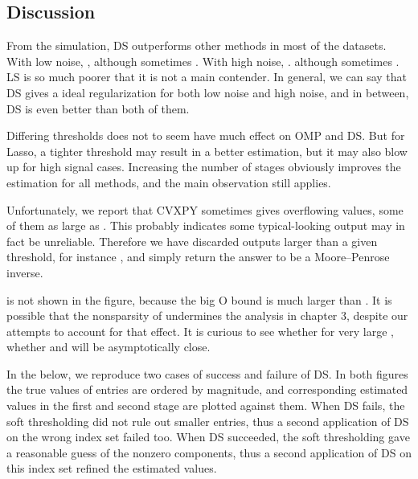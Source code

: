 
\subsection {Discussion}

From the simulation, DS outperforms other methods in most of the datasets.
With low noise, ,
although sometimes .
With high noise, .
although sometimes .
LS is so much poorer that it is not a main contender.
In general, we can say that DS gives a ideal regularization for both low noise and high noise, and in between, DS is even better than both of them.

Differing thresholds does not to seem have much effect on OMP and DS.
But for Lasso, a tighter threshold may result in a better estimation, but it may also blow up for high signal cases.
Increasing the number of stages obviously improves the estimation for all methods, and the main observation still applies.

Unfortunately, we report that CVXPY sometimes gives overflowing values, some of them as large as .
This probably indicates some typical-looking output may in fact be unreliable.
Therefore we have discarded outputs larger than a given threshold, for instance , and simply return the answer to be a Moore–Penrose inverse.

\m {\chi} is not shown in the figure, because the big O bound is much larger than \m {\tilde {\chi}}.
It is possible that the nonsparsity of  undermines the analysis in chapter 3, despite our attempts to account for that effect.
It is curious to see whether for very large , whether \m {\tilde {\chi}} and \m {\chi} will be asymptotically close.

In the below, we reproduce two cases of success and failure of DS.
In both figures the true values of  entries are ordered by magnitude, and corresponding estimated values in the first and second stage are plotted against them.
When DS fails, the soft thresholding did not rule out smaller entries, thus a second application of DS on the wrong index set failed too.
When DS succeeded, the soft thresholding gave a reasonable guess of the nonzero components, thus a second application of DS on this index set refined the estimated values.


